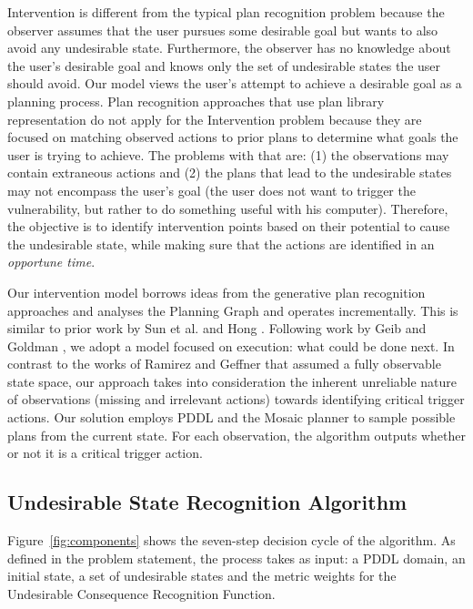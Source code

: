 Intervention is different from the typical plan recognition problem because the observer assumes that the user pursues some desirable goal but wants to also avoid any undesirable state. 
Furthermore, the observer has no knowledge about the user's desirable goal and knows only the set of undesirable states the user should avoid. 
Our model views the user's attempt to achieve a desirable goal as a planning process. 
Plan recognition approaches that use plan library representation do not apply for the Intervention problem because they are focused on matching observed actions to prior plans to determine what goals the user is trying to achieve.
The problems with that are: (1) the observations may contain extraneous actions and (2) the plans that lead to the undesirable states may not encompass the user's goal (the user does not want to trigger the vulnerability, but rather to do something useful with his computer).
Therefore, the objective is to identify intervention points based on their potential to cause the undesirable state, while making sure that the actions are identified in an \textit{opportune time}.

 
Our intervention model borrows ideas from the generative plan recognition approaches and analyses the Planning Graph and operates incrementally.
This is similar to prior work by Sun et al. \citeyear{sun2007recognizing} and Hong \citeyear{hong2001goal}. 
Following work by Geib and Goldman \citeyear{GeibGoldman09}, we adopt a model focused on execution: what could be done next. 
In contrast to the works of Ramirez and Geffner \citeyear{ramirez2009plan,ramirez2010probabilistic} that assumed a fully observable state space, our approach takes into consideration the inherent unreliable nature of observations (missing and irrelevant actions) towards identifying critical trigger actions. 
Our solution employs PDDL and the Mosaic planner \cite{roberts2014} to sample possible plans from the current state. 
For each observation, the algorithm outputs whether or not it is a critical trigger action. 

\subsection{Undesirable State Recognition Algorithm}
Figure~\ref{fig:components} shows the seven-step decision cycle of the algorithm. As defined in the problem statement, the process takes as input: a PDDL domain, an initial state, a set of undesirable states and the metric weights for the Undesirable Consequence Recognition Function. 

